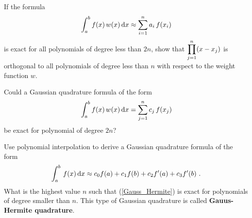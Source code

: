 \begin{question}
If the formula
\[
\int_a^b f(x)\,w(x)\,\mathrm{d}x \approx \sum_{i=1}^n a_i \,f(x_i)
\]
is exact for all polynomials of degree less than $2n$, show that
$\displaystyle \prod_{j=1}^n (x-x_j)$ is orthogonal to all polynomials
of degree less than $n$ with respect to the weight function $w$.
\end{question}


\begin{question}
Could a Gaussian quadrature formula of the form
\begin{equation}\label{2nQuadrQuestEqu}
\int_a^b f(x)\,w(x) \,\mathrm{d}x = \sum_{j=1}^n c_j \,f(x_j)
\end{equation}
be exact for polynomial of degree $2n$?
\label{diffQ40}
\end{question}


\begin{question}
Use polynomial interpolation to derive a Gaussian quadrature
formula of the form
\begin{equation} \label{Gauss_Hermite}
\int_a^b\,f(x)\,\mathrm{d}x \approx c_0 f(a) + c_1 f(b) + c_2 f'(a) + c_3f'(b) \ .
\end{equation}
What is the highest value $n$ such that (\ref{Gauss_Hermite}) is exact
for polynomials of degree smaller than $n$.  This type of Gaussian
quadrature is called
{\bfseries Gauus-Hermite quadrature}.
\end{question}


